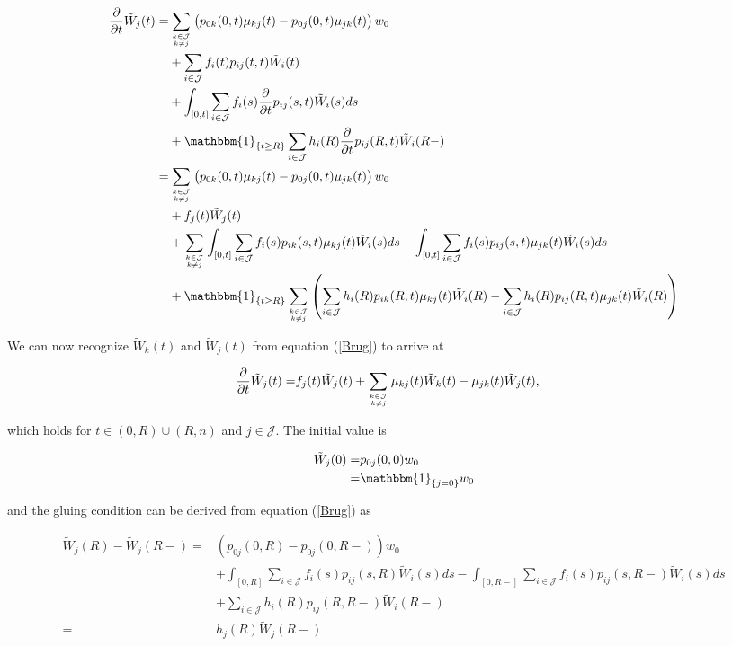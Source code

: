 \documentclass{article}
\newcommand{\1}[1]{\mathbbm{1}_{\left\lbrace #1 \right\rbrace}}
\theoremstyle{break}
\theoremstyle{remark}
\numberwithin{equation}{section}
\begin{document}
\begin{align*}
	\frac{\partial}{\partial t} \tilde{W}_j(t) =&\sum_{k \in \mathcal{J} \atop k \neq j} \left(p_{0k}(0,t) \mu_{kj}(t) - p_{0j}(0,t) \mu_{jk}(t) \right) w_0 \\
	&+ \sum_{i \in \mathcal{J}} f_i(t) p_{ij}(t,t) \tilde{W}_i(t) \\
	&+ \int_{\left[ 0,t \right]} \sum_{i \in \mathcal{J}} f_{i}(s) \frac{\partial}{\partial t} p_{ij}(s,t) \tilde{W}_i(s) ds \\
	&+ \1{t \geq R} \sum_{i \in \mathcal{J}} h_{i}(R) \frac{\partial}{\partial t} p_{ij}(R,t) \tilde{W}_i(R-) \\
	=& \sum_{k \in \mathcal{J} \atop k \neq j} \left(p_{0k}(0,t) \mu_{kj}(t) - p_{0j}(0,t) \mu_{jk}(t) \right) w_0 \\
	&+ f_j(t) \tilde{W}_j(t) \\
	&+ \sum_{k \in \mathcal{J} \atop k \neq j} \int_{\left[ 0,t \right]} \sum_{i \in \mathcal{J}} f_{i}(s) p_{ik}(s,t) \mu_{kj}(t) \tilde{W}_i(s) ds - \int_{\left[ 0,t \right]} \sum_{i \in \mathcal{J}} f_{i}(s) p_{ij}(s,t) \mu_{jk}(t) \tilde{W}_i(s) ds \\
	&+ \1{t \geq R} \sum_{k \in \mathcal{J} \atop k \neq j} \left( \sum_{i \in \mathcal{J}} h_{i}(R) p_{ik}(R,t) \mu_{kj}(t) \tilde{W}_i(R) - \sum_{i \in \mathcal{J}} h_{i}(R) p_{ij}(R,t) \mu_{jk}(t) \tilde{W}_i(R) \right) \\
\end{align*}

We can now recognize $\tilde{W}_k(t)$ and $\tilde{W}_j(t)$ from equation (\ref{Brug}) to arrive at

\begin{align*}
	\frac{\partial}{\partial t} \tilde{W}_j(t) =& f_j(t) \tilde{W}_j(t) + \sum_{k \in \mathcal{J} \atop k \neq j} \mu_{kj}(t) \tilde{W}_k(t) - \mu_{jk}(t) \tilde{W}_j(t),
\end{align*}

which holds for $t \in (0,R)\cup(R,n)$ and $j \in \mathcal{J}$. The initial value is

\begin{align*}
	\tilde{W}_j(0) =& p_{0j}(0,0) w_0 \\
	=& \1{j=0} w_0
\end{align*}

and the gluing condition can be derived from equation (\ref{Brug}) as

\begin{align*}
	\tilde{W}_j(R) - \tilde{W}_j(R-) =& \left(p_{0j}(0,R) - p_{0j}(0,R-)\right) w_0 \\
	&+ \int_{\left[ 0,R \right]} \sum_{i \in \mathcal{J}} f_{i}(s) p_{ij}(s,R) \tilde{W}_i(s) ds - \int_{\left[ 0,R- \right]} \sum_{i \in \mathcal{J}} f_{i}(s) p_{ij}(s,R-) \tilde{W}_i(s) ds \\
	&+ \sum_{i \in \mathcal{J}} h_{i}(R) p_{ij}(R,R-) \tilde{W}_i(R-) \\
	=& h_{j}(R) \tilde{W}_j(R-)
\end{align*}
\end{document}
